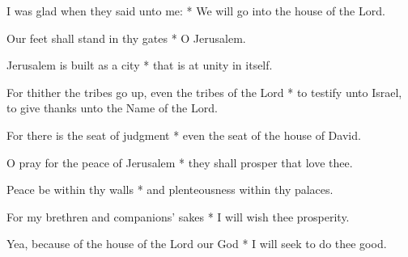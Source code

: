 \begin{multicols}{2}
	
	I was glad when they said unto me: * We will go into the house of the Lord.
	
	Our feet shall stand in thy gates * O Jerusalem.
	
	Jerusalem is built as a city * that is at unity in itself.
	
	For thither the tribes go up, even the tribes of the Lord * to testify unto Israel, to give thanks unto the Name of the Lord.
	
	For there is the seat of judgment * even the seat of the house of David.
	
	O pray for the peace of Jerusalem * they shall prosper that love thee.
	
	Peace be within thy walls * and plenteousness within thy palaces.
	
	For my brethren and companions' sakes * I will wish thee prosperity.
	
	Yea, because of the house of the Lord our God * I will seek to do thee good.
	
	\gloria{}
\end{multicols}